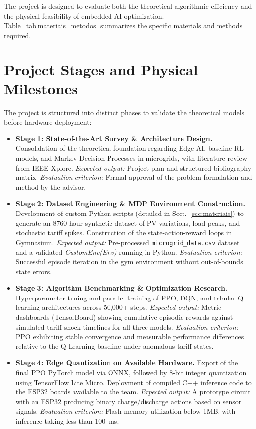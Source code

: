 \documentclass[conference]{IEEEtran}
\begin{document}
The project is designed to evaluate both the theoretical algorithmic efficiency and the physical feasibility of embedded AI optimization. Table~\ref{tab:materiais_metodos} summarizes the specific materials and methods required.

\section{Project Stages and Physical Milestones}
\label{sec:etapas}

The project is structured into distinct phases to validate the theoretical models before hardware deployment:

\begin{itemize}
    \item \textbf{Stage 1: State-of-the-Art Survey \& Architecture Design.} Consolidation of the theoretical foundation regarding Edge AI, baseline RL models, and Markov Decision Processes in microgrids, with literature review from IEEE Xplore. \textit{Expected output:} Project plan and structured bibliography matrix. \textit{Evaluation criterion:} Formal approval of the problem formulation and method by the advisor.
    \item \textbf{Stage 2: Dataset Engineering \& MDP Environment Construction.} Development of custom Python scripts (detailed in Sect.~\ref{sec:materiais}) to generate an 8760-hour synthetic dataset of PV variations, load peaks, and stochastic tariff spikes. Construction of the state-action-reward loops in Gymnasium. \textit{Expected output:} Pre-processed \texttt{microgrid\_data.csv} dataset and a validated \textit{CustomEnv(Env)} running in Python. \textit{Evaluation criterion:} Successful episode iteration in the gym environment without out-of-bounds state errors.
    \item \textbf{Stage 3: Algorithm Benchmarking \& Optimization Research.} Hyperparameter tuning and parallel training of PPO, DQN, and tabular Q-learning architectures across 50,000+ steps. \textit{Expected output:} Metric dashboards (TensorBoard) showing cumulative episodic rewards against simulated tariff-shock timelines for all three models. \textit{Evaluation criterion:} PPO exhibiting stable convergence and measurable performance differences relative to the Q-Learning baseline under anomalous tariff states.
    \item \textbf{Stage 4: Edge Quantization on Available Hardware.} Export of the final PPO PyTorch model via ONNX, followed by 8-bit integer quantization using TensorFlow Lite Micro. Deployment of compiled C++ inference code to the ESP32 boards available to the team. \textit{Expected output:} A prototype circuit with an ESP32 producing binary charge/discharge actions based on sensor signals. \textit{Evaluation criterion:} Flash memory utilization below 1MB, with inference taking less than 100~ms.

\end{itemize}
\end{document}
